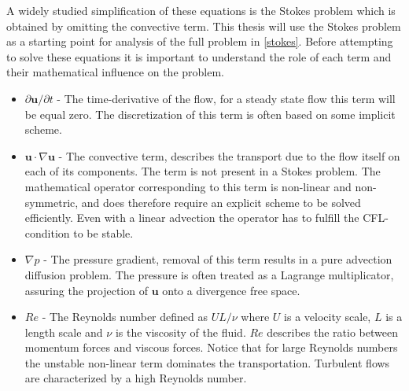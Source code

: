 A widely studied simplification of these equations is the Stokes problem which
is obtained by omitting the convective term. This thesis will use the Stokes 
problem as a starting point for analysis of the full problem in \cref{stokes}.
Before attempting to solve these equations it is important to understand the role of each term 
and their mathematical influence on the problem. 
\begin{itemize}
    \item $\partial \mathbf{u} /\partial t$
     - The time-derivative of the flow, for a steady state flow this term will be equal zero.
             The discretization of this term is often based on some implicit scheme. 
    \item $\mathbf{u} \cdot \nabla \mathbf{u}$
     - The convective term, describes the transport due to the flow itself on each of its components. 
    The term is not present in a Stokes problem.
    The mathematical operator corresponding to this term is non-linear and non-symmetric, 
    and does therefore require an explicit scheme to be solved efficiently.
    Even with a linear advection the operator has to fulfill the CFL-condition to be stable. 

    \item $\nabla p$
    - The pressure gradient, removal of this term results in a pure advection diffusion problem. The pressure is often 
    treated as a Lagrange multiplicator, assuring the projection of $\mathbf{u}$ onto a divergence free space.

    \item $Re$ 
    - The Reynolds number defined as $UL/\nu$ where $U$ is a velocity scale, $L$ is a length scale and $\nu$ 
      is the viscosity of the fluid. $Re$ describes the ratio between momentum forces and viscous forces.
      Notice that for large Reynolds numbers the unstable non-linear term dominates the transportation.
      Turbulent flows are characterized by a high Reynolds number.


\end{itemize}
